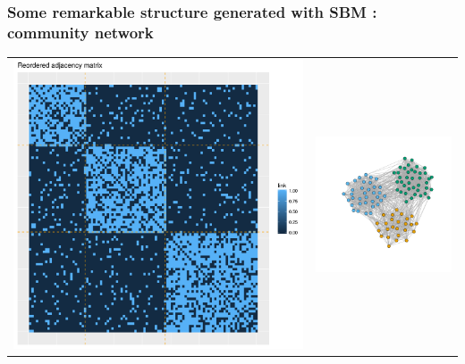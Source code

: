 \documentclass[nopagenumber,9pt]{beamer}
\begin{document}
\begin{frame}
\frametitle{Some remarkable structure generated with SBM : community network}

\centering
\begin{tabular}{cc}
 \includegraphics[scale=.2]{plots/sbm/Affiliation_reordered_adja_with_groups.png}&
\includegraphics[scale=.2]{plots/sbm/Affiliation_graphe_with_colors.png} 
 \end{tabular}


\end{frame}
\end{document}
